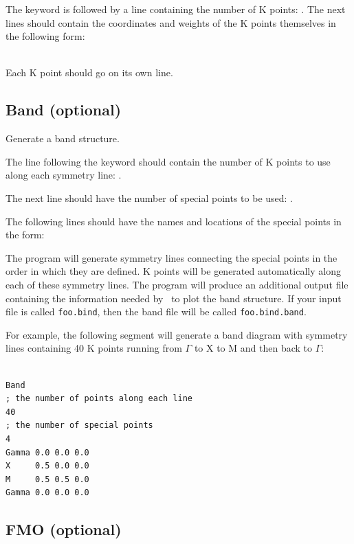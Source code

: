 The keyword is followed by a line containing the number of K points:
.   The next  lines should contain
the coordinates and weights of the K points themselves in the
following form:

    \\

\noindent Each K point should go on its own line.

\subsection{{\sf Band} (optional)}

Generate a band structure.

The line following the keyword should contain the number of K points
to use along each symmetry line: .

The next line should have the number of special points to be used:
. 

The following  lines should have the names
and locations of the special points in the form:

   

The program will generate symmetry lines connecting the special points
in the order in which they are defined.   K
points will be generated automatically along each of these symmetry
lines.  The program will produce an additional output file containing
the information needed by \viewprog\ to plot the band structure.  If
your input file is called {\tt foo.bind}, then the band file will be
called {\tt foo.bind.band}.

For example, the following segment will generate a band diagram with
symmetry lines containing 40 K points running from $\Gamma$ to X to M and
then back to $\Gamma$:

\shrinkspacing
\begin{verbatim}

Band
; the number of points along each line
40
; the number of special points
4
Gamma 0.0 0.0 0.0
X     0.5 0.0 0.0
M     0.5 0.5 0.0
Gamma 0.0 0.0 0.0

\end{verbatim}
\resumespacing

\subsection{{\sf FMO} (optional)}

